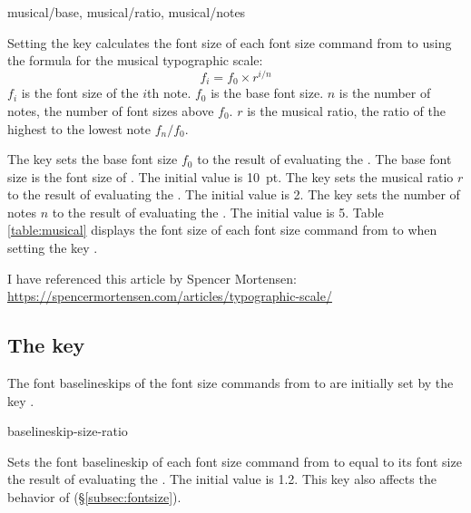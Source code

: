 \documentclass{beerydoc}
\begin{document}
\begin{variable}{musical/base, musical/ratio, musical/notes}
  \begin{syntax}
  \end{syntax}
  Setting the key  calculates the font size of
  each font size command from  to  using the formula for the
  musical typographic scale:\footnotemark
  \begin{equation*}
    f_i = f_0 \times r ^ { i / n }
  \end{equation*}
  $f_i$ is the font size of the $i$th note.
  $f_0$ is the base font size.
  $n$ is the number of notes, the number of font sizes above $f_0$.
  $r$ is the musical ratio, the ratio of the highest to the lowest note
  $ f_n / f_0 $.

  The key  sets the base font size $f_0$ to the result of
  evaluating the .
  The base font size is the font size of .
  The initial value is \qty{10}{pt}.
  The key  sets the musical ratio $r$ to the result of
  evaluating the .
  The initial value is \num{2}.
  The key  sets the number of notes $n$ to the result of
  evaluating the .
  The initial value is \num{5}.
  Table \ref{table:musical} displays the font size of each font size command
  from  to  when setting the key
  .
\end{variable}
\footnotetext
  {%
    I have referenced this article by Spencer Mortensen:
    \newline
    \url{https://spencermortensen.com/articles/typographic-scale/}%
  }



\subsection{The key }
\label{subsec:baselineskipsizeratio}

The font baselineskips of the font size commands from  to 
are initially set by the key .

\begin{variable}{baselineskip-size-ratio}
  \begin{syntax}
  \end{syntax}
  Sets the font baselineskip of each font size command from  to
   equal to its font size \texttimes{} the result of evaluating the
  .
  The initial value is \num{1.2}.
  This key also affects the behavior of 
  (\S\ref{subsec:fontsize}).
\end{variable}
\end{document}
